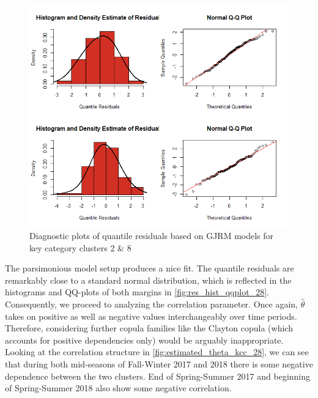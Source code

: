 \begin{figure}[H]
\centering
  \includegraphics[width=0.80\linewidth]{figures/res_hist_qqplot_28.png}
  \caption{Diagnostic plots of quantile residuals based on \ac{GJRM} models for key category clusters 2 \& 8}
  \label{fig:res_hist_qqplot_28}
\end{figure}

The parsimonious model setup produces a nice fit. The quantile residuals are remarkably close to a standard normal distribution, which is reflected in the histograms and QQ-plots of both margins in \autoref{fig:res_hist_qqplot_28}.\\
Consequently, we proceed to analyzing the correlation parameter. Once again, $\hat{\theta}$ takes on positive as well as negative values interchangeably over time periods. Therefore, considering further copula families like the Clayton copula (which accounts for positive dependencies only) would be arguably inappropriate.
\\


Looking at the correlation structure in \autoref{fig:estimated_theta_kcc_28}, we can see that during both mid-seasons of Fall-Winter 2017 and 2018 there is some negative dependence between the two clusters. End of Spring-Summer 2017 and beginning of Spring-Summer 2018 also show some negative correlation.
\\

